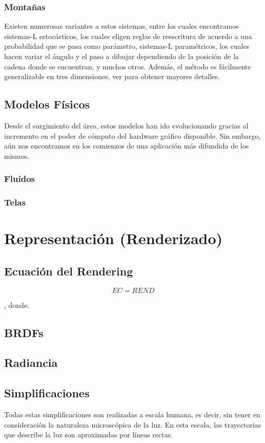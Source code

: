 \subsubsection{Montañas}

Existen numerosas variantes a estos sistemas, entre los cuales encontramos sistemas-L estocásticos, los cuales eligen reglas de reescritura de acuerdo a una probabilidad que se pasa como parámetro, sistemas-L paramétricos, los cuales hacen variar el ángulo y el paso a dibujar dependiendo de la posición de la cadena donde se encuentran, y muchos otros.
Además, el método es fácilmente generalizable en tres dimensiones, ver \cite{Prusinkiewicz1990} para obtener mayores detalles.

\subsection{Modelos Físicos}
Desde el surgimiento del área, estos modelos han ido evolucionando gracias al incremento en el poder de cómputo del hardware gráfico disponible. Sin embargo, aún nos encontramos en los comienzos de una aplicación más difundida de los mismos.
\subsubsection{Fluídos}
\subsubsection{Telas}

\section{Representación (Renderizado)}
\subsection{Ecuación del Rendering}

\begin{equation}
EC  = REND
\end{equation}

, donde.


\subsection{BRDFs}
\subsection{Radiancia}
\subsection{Simplificaciones}
Todas estas simplificaciones son realizadas a escala humana, es decir, sin tener en consideración la naturaleza microscópica de la luz. En esta escala, las trayectorias que describe la luz son aproximadas por líneas rectas.
